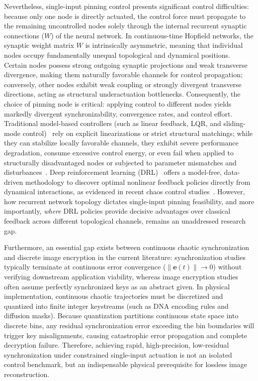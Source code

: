 \documentclass[a4paper,fleqn]{cas-dc}
\theoremstyle{plain}
\theoremstyle{definition}
\begin{document}
Nevertheless, single-input pinning control presents significant control difficulties: because only one node is directly actuated, the control force must propagate to the remaining uncontrolled nodes solely through the internal recurrent synaptic connections ($W$) of the neural network. In continuous-time Hopfield networks, the synaptic weight matrix $W$ is intrinsically asymmetric, meaning that individual nodes occupy fundamentally unequal topological and dynamical positions. Certain nodes possess strong outgoing synaptic projections and weak transverse divergence, making them naturally favorable channels for control propagation; conversely, other nodes exhibit weak coupling or strongly divergent transverse directions, acting as structural underactuation bottlenecks. Consequently, the choice of pinning node is critical: applying control to different nodes yields markedly divergent synchronizability, convergence rates, and control effort. Traditional model-based controllers (such as linear feedback, LQR, and sliding-mode control)~\cite{wang2003feedback,li2005impulsive,chen2014pinning,mobayen2018chaos} rely on explicit linearizations or strict structural matchings; while they can stabilize locally favorable channels, they exhibit severe performance degradation, consume excessive control energy, or even fail when applied to structurally disadvantaged nodes or subjected to parameter mismatches and disturbances~\cite{zhang2011weak,cao2024synchronisation}. Deep reinforcement learning (DRL)~\cite{sutton2018reinforcement,mnih2015human,carlucho2020adaptive} offers a model-free, data-driven methodology to discover optimal nonlinear feedback policies directly from dynamical interactions, as evidenced in recent chaos control studies~\cite{bucci2019control,vashishtha2020restoring,han2021control,cheng2023deep,cheng2025generalized,yau2024ppo,xu2025ppo,jin2025Deep,weissenbacher2025reinforcement}. However, how recurrent network topology dictates single-input pinning feasibility, and more importantly, \emph{where} DRL policies provide decisive advantages over classical feedback across different topological channels, remains an unaddressed research gap.

Furthermore, an essential gap exists between continuous chaotic synchronization and discrete image encryption in the current literature: synchronization studies typically terminate at continuous error convergence ($\|\mathbf{e}(t)\| \to 0$) without verifying downstream application viability, whereas image encryption studies often assume perfectly synchronized keys as an abstract given. In physical implementation, continuous chaotic trajectories must be discretized and quantized into finite integer keystreams (such as DNA encoding rules and diffusion masks). Because quantization partitions continuous state space into discrete bins, any residual synchronization error exceeding the bin boundaries will trigger key misalignments, causing catastrophic error propagation and complete decryption failure. Therefore, achieving rapid, high-precision, low-residual synchronization under constrained single-input actuation is not an isolated control benchmark, but an indispensable physical prerequisite for lossless image reconstruction.
\end{document}
